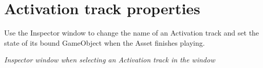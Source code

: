 \chapter{Activation track properties}
\hypertarget{md__hey_tea_9_2_library_2_package_cache_2com_8unity_8timeline_0d1_87_85_2_documentation_0i_2insp__trk__act}{}\label{md__hey_tea_9_2_library_2_package_cache_2com_8unity_8timeline_0d1_87_85_2_documentation_0i_2insp__trk__act}
\label{md__hey_tea_9_2_library_2_package_cache_2com_8unity_8timeline_0d1_87_85_2_documentation_0i_2insp__trk__act_autotoc_md4683}%
%
 Use the Inspector window to change the name of an Activation track and set the state of its bound Game\+Object when the  Asset finishes playing.



{\itshape Inspector window when selecting an Activation track in the  window}

